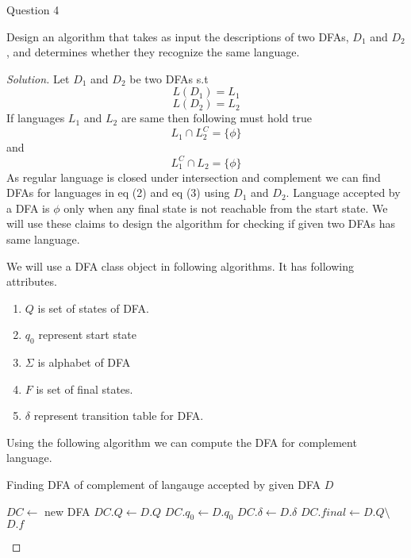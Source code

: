 \begin{solution}{Question 4}\label{ques:4}
    \begin{question}
    Design an algorithm that takes as input the descriptions of two DFAs, $D_1$ and $D_2$, and
    determines whether they recognize the same language.
    \end{question}
    \tcblower{}
    \begin{proof}[Solution]
        Let $D_1$ and $D_2$ be two DFAs s.t 
        \[L(D_1) = L_1 \]
        \[L(D_2) = L_2 \]
        If languages $L_1$ and $L_2$ are same then following must hold true
        \begin{equation}
            L_1 \cap L_2^C = \{\phi\}
        \end{equation}
        and
        \begin{equation}
            L_1^C \cap L_2 = \{\phi\}
        \end{equation}
        As regular language is closed under intersection and complement we can find DFAs for languages in eq (2) and eq (3) using $D_1$ and $D_2$. Language accepted by a DFA is ${\phi}$ only when any final state is not reachable from the start state. We will use these claims to design the algorithm for checking if given two DFAs has same language.
        
        We will use a DFA class object in following algorithms. It has following attributes.
        \begin{enumerate}
            \item $Q$ is set of states of DFA.
            \item $q_0$ represent start state
            \item $\Sigma$ is alphabet of DFA
            \item $F$ is set of final states.
            \item $\delta$ represent transition table for DFA.
        \end{enumerate}
        Using the following algorithm we can compute the DFA for complement language.
        \begin{algorithm}[H]
            \caption{Finding DFA of complement of langauge accepted by given DFA $D$}
            \begin{algorithmic}[1]
                    \State $DC \gets$ new DFA
                    \State $DC.Q \gets D.Q$
                    \State $DC.q_0 \gets D.q_0$
                    \State $DC.\delta \gets D.\delta$
                    \State $DC.final \gets D.Q \setminus$ $D.f$ 
                \EndProcedure{}
            \end{algorithmic}
        \end{algorithm}
        

\end{proof}
\end{solution}
